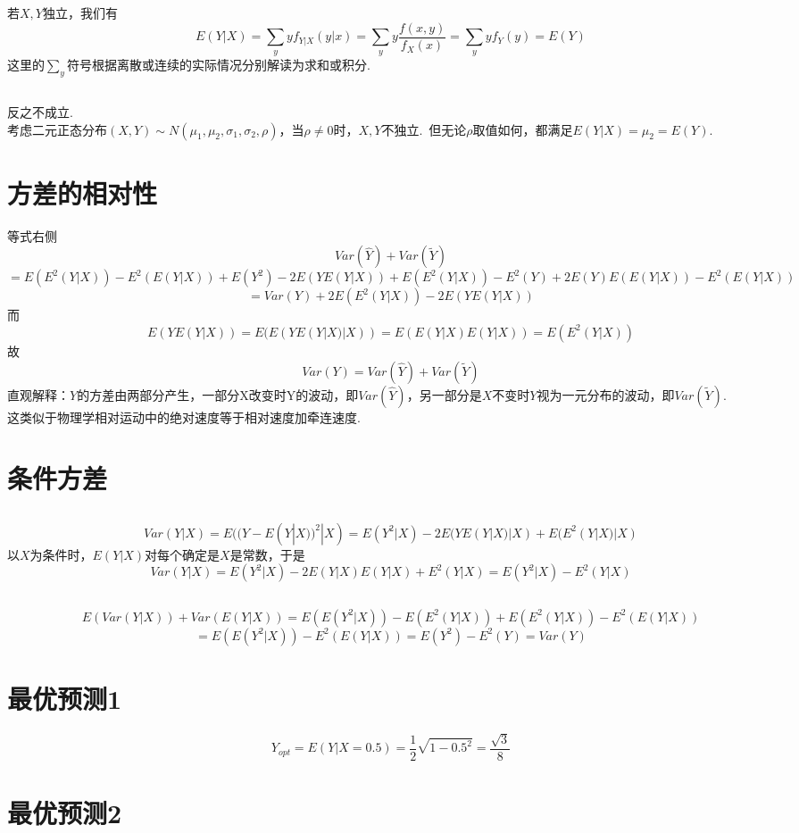 \documentclass{article}
\begin{document}
\begin{CJK}{UTF8}{gbsn}
\subsection{}
若$X,Y$独立，我们有
$$ E(Y|X)=\sum\limits_{y}yf_{Y|X}(y|x)=\sum\limits_{y}y\frac{f(x,y)}{f_{X}(x)}=\sum\limits_{y}yf_{Y}(y)=E(Y)$$
这里的$\sum\limits_{y}$符号根据离散或连续的实际情况分别解读为求和或积分.
\subsection{}
反之不成立.\\
考虑二元正态分布$(X,Y)\sim N(\mu_{1},\mu_{2},\sigma_{1},\sigma_{2},\rho)$，当$\rho\neq0$时，$X,Y$不独立.\ 但无论$\rho$取值如何，都满足$E(Y|X)=\mu_{2}=E(Y)$.
\section{方差的相对性}
等式右侧
$$ Var(\hat{Y})+Var(\tilde{Y}) $$
$$=E(E^{2}(Y|X))-E^{2}(E(Y|X))+E(Y^{2})-2E(YE(Y|X))+E(E^{2}(Y|X))-E^{2}(Y)+2E(Y)E(E(Y|X))-E^{2}(E(Y|X))$$
$$=Var(Y)+2E(E^{2}(Y|X))-2E(YE(Y|X)) $$
而
$$ E(YE(Y|X))=E(E(YE(Y|X)|X))=E(E(Y|X)E(Y|X))=E(E^{2}(Y|X))$$
故
$$ Var(Y)=Var(\hat{Y})+Var(\tilde{Y})$$
直观解释：$Y$的方差由两部分产生，一部分X改变时Y的波动，即$Var(\hat{Y})$，另一部分是$X$不变时$Y$视为一元分布的波动，即$Var(\tilde{Y})$.
\\这类似于物理学相对运动中的绝对速度等于相对速度加牵连速度.
\section{条件方差}
\subsection{}
$$ Var(Y|X)=E((Y-E(Y|X))^{2}|X)=E(Y^{2}|X)-2E(YE(Y|X)|X)+E(E^{2}(Y|X)|X)$$
以$X$为条件时，$E(Y|X)$对每个确定是$X$是常数，于是
$$ Var(Y|X)=E(Y^{2}|X)-2E(Y|X)E(Y|X)+E^{2}(Y|X)=E(Y^{2}|X)-E^{2}(Y|X)$$
\subsection{}
$$E(Var(Y|X))+Var(E(Y|X))=E(E(Y^{2}|X))-E(E^{2}(Y|X))+E(E^{2}(Y|X))-E^{2}(E(Y|X))$$
$$ =E(E(Y^{2}|X))-E^{2}(E(Y|X))=E(Y^{2})-E^{2}(Y)=Var(Y)$$
\section{最优预测1}
$$ Y_{opt}=E(Y|X=0.5)=\frac{1}{2}\sqrt{1-0.5^{2}}=\frac{\sqrt{3}}{8}$$ 
\section{最优预测2}

\end{CJK}
\end{document}
